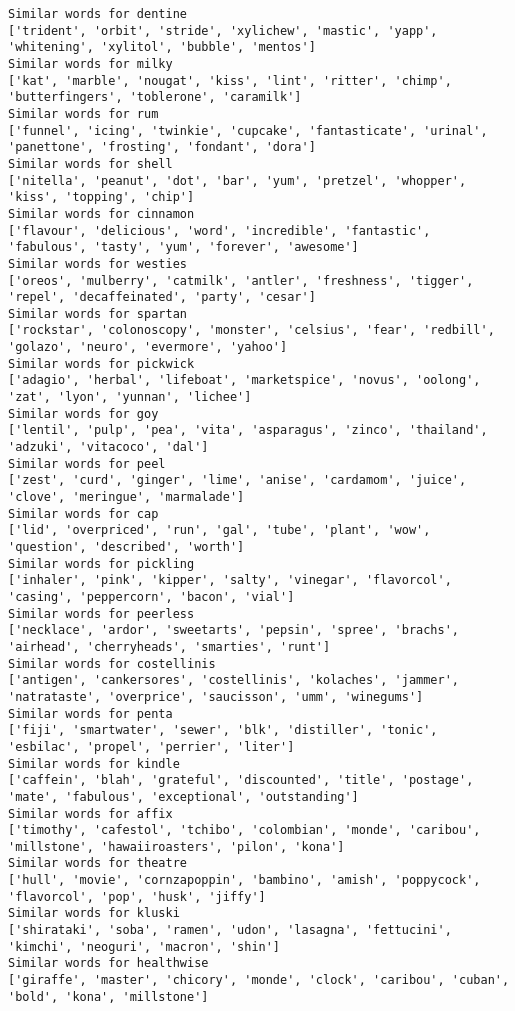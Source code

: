 \documentclass[11pt]{article}
\begin{document}
\begin{Verbatim}[commandchars=\\\{\}]
Similar words for dentine
['trident', 'orbit', 'stride', 'xylichew', 'mastic', 'yapp', 'whitening', 'xylitol', 'bubble', 'mentos']
Similar words for milky
['kat', 'marble', 'nougat', 'kiss', 'lint', 'ritter', 'chimp', 'butterfingers', 'toblerone', 'caramilk']
Similar words for rum
['funnel', 'icing', 'twinkie', 'cupcake', 'fantasticate', 'urinal', 'panettone', 'frosting', 'fondant', 'dora']
Similar words for shell
['nitella', 'peanut', 'dot', 'bar', 'yum', 'pretzel', 'whopper', 'kiss', 'topping', 'chip']
Similar words for cinnamon
['flavour', 'delicious', 'word', 'incredible', 'fantastic', 'fabulous', 'tasty', 'yum', 'forever', 'awesome']
Similar words for westies
['oreos', 'mulberry', 'catmilk', 'antler', 'freshness', 'tigger', 'repel', 'decaffeinated', 'party', 'cesar']
Similar words for spartan
['rockstar', 'colonoscopy', 'monster', 'celsius', 'fear', 'redbill', 'golazo', 'neuro', 'evermore', 'yahoo']
Similar words for pickwick
['adagio', 'herbal', 'lifeboat', 'marketspice', 'novus', 'oolong', 'zat', 'lyon', 'yunnan', 'lichee']
Similar words for goy
['lentil', 'pulp', 'pea', 'vita', 'asparagus', 'zinco', 'thailand', 'adzuki', 'vitacoco', 'dal']
Similar words for peel
['zest', 'curd', 'ginger', 'lime', 'anise', 'cardamom', 'juice', 'clove', 'meringue', 'marmalade']
Similar words for cap
['lid', 'overpriced', 'run', 'gal', 'tube', 'plant', 'wow', 'question', 'described', 'worth']
Similar words for pickling
['inhaler', 'pink', 'kipper', 'salty', 'vinegar', 'flavorcol', 'casing', 'peppercorn', 'bacon', 'vial']
Similar words for peerless
['necklace', 'ardor', 'sweetarts', 'pepsin', 'spree', 'brachs', 'airhead', 'cherryheads', 'smarties', 'runt']
Similar words for costellinis
['antigen', 'cankersores', 'costellinis', 'kolaches', 'jammer', 'natrataste', 'overprice', 'saucisson', 'umm', 'winegums']
Similar words for penta
['fiji', 'smartwater', 'sewer', 'blk', 'distiller', 'tonic', 'esbilac', 'propel', 'perrier', 'liter']
Similar words for kindle
['caffein', 'blah', 'grateful', 'discounted', 'title', 'postage', 'mate', 'fabulous', 'exceptional', 'outstanding']
Similar words for affix
['timothy', 'cafestol', 'tchibo', 'colombian', 'monde', 'caribou', 'millstone', 'hawaiiroasters', 'pilon', 'kona']
Similar words for theatre
['hull', 'movie', 'cornzapoppin', 'bambino', 'amish', 'poppycock', 'flavorcol', 'pop', 'husk', 'jiffy']
Similar words for kluski
['shirataki', 'soba', 'ramen', 'udon', 'lasagna', 'fettucini', 'kimchi', 'neoguri', 'macron', 'shin']
Similar words for healthwise
['giraffe', 'master', 'chicory', 'monde', 'clock', 'caribou', 'cuban', 'bold', 'kona', 'millstone']

\end{Verbatim}
\end{document}
